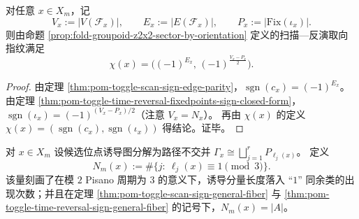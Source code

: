 \begin{proposition}[取向指纹的几何审计闭式]\label{prop:pom-orientation-fingerprint-geometry-audit}
对任意 \(x\in X_m\)，记
\[
V_x:=|V(\mathcal F_x)|,\qquad
E_x:=|E(\mathcal F_x)|,\qquad
P_x:=|\mathrm{Fix}(\iota_x)|.
\]
则由命题 \ref{prop:fold-groupoid-z2x2-sector-by-orientation} 定义的扫描—反演取向指纹满足
\[
\chi(x)=\bigl((-1)^{E_x},\,(-1)^{\frac{V_x-P_x}{2}}\bigr).
\]
\end{proposition}
\begin{proof}
由定理 \ref{thm:pom-toggle-scan-sign-edge-parity}，\(\operatorname{sgn}(c_x)=(-1)^{E_x}\)。
由定理 \ref{thm:pom-toggle-time-reversal-fixedpoints-sign-closed-form}，\(\operatorname{sgn}(\iota_x)=(-1)^{(V_x-P_x)/2}\)（注意 \(V_x=N_x\)）。
再由 \(\chi(x)\) 的定义 \(\chi(x)=(\operatorname{sgn}(c_x),\operatorname{sgn}(\iota_x))\) 得结论。证毕。
\end{proof}

\begin{definition}\label{def:pom-pisano1-component-count}
对 \(x\in X_m\) 设候选位点诱导图分解为路径不交并 \(\Gamma_x\cong\bigsqcup_{j=1}^r P_{\ell_j(x)}\)。
定义
\[
N_m(x):=\#\{j:\ \ell_j(x)\equiv 1\pmod 3\}.
\]
该量刻画了在模 \(2\) Pisano 周期为 \(3\) 的意义下，诱导分量长度落入 “\(1\)” 同余类的出现次数；并且在定理 \ref{thm:pom-toggle-scan-sign-general-fiber} 与 \ref{thm:pom-toggle-time-reversal-sign-general-fiber} 的记号下，\(N_m(x)=|A|\)。
\end{definition}

